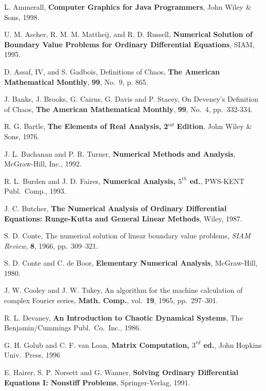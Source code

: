 \begin{thebibliography}{99}

 L. Ammerall, {\bfseries Computer Graphics for Java
Programmers}, John Wiley \& Sons, 1998.

 U. M. Ascher, R. M. M. Mattheij, and R. D. Russell,
{\bfseries Numerical Solution of Boundary Value Problems for Ordinary
Differential Equations}, SIAM, 1995.

 D. Assaf, IV, and S. Gadbois, Definitions of Chaos,
{\bfseries The American Mathematical Monthly}, {\bfseries 99}, No.\ 9, p. 865.

 J. Banks, J. Brooks, G. Cairns, G. Davis and
P. Stacey, On Deveney's Definition of Chaos, {\bfseries The American
Mathematical Monthly}, {\bfseries 99}, No.\ 4, pp.\ 332-334.

 R. G. Bartle, {\bfseries The Elements of Real Analysis, 2$^{nd}$
Edition}, John Wiley \& Sons, 1976.

 J. L. Buchanan and P. R. Turner, {\bfseries Numerical Methods
and Analysis}, McGraw-Hill, Inc., 1992.

 R. L. Burden and J. D. Faires, {\bfseries Numerical
Analysis, $5^{th}$ ed.}, PWS-KENT Publ.\ Comp., 1993.

 J. C. Butcher, {\bfseries The Numerical Analysis of
Ordinary Differential Equations: Runge-Kutta and General Linear
Methods}, Wiley, 1987.

 S. D. Conte, The numerical solution of linear boundary
value problems, {\em SIAM Review}, {\bfseries 8}, 1966, pp.\ 309--321.

 S. D. Conte and C. de Boor, {\bfseries Elementary
Numerical Analysis}, McGraw-Hill, 1980.

 J. W. Cooley and J. W. Tukey, An algorithm for the
machine calculation of complex Fourier series, {\bfseries Math. Comp.},
vol.\ {\bfseries 19}, 1965, pp.\ 297--301.

 R. L. Devaney, {\bfseries An Introduction to Chaotic
Dynamical Systems}, The Benjamin/Cummings Publ.\ Co.\ Inc., 1986.

 G. H. Golub and C. F. van Loan, {\bfseries Matrix
Computation, $3^{rd}$ ed.}, John Hopkins Univ.\ Press, 1996

 E. Hairer, S. P. Norsett and G. Wanner, {\bfseries
Solving Ordinary Differential Equations I: Nonstiff Problems},
Springer-Verlag, 1991.


\end{thebibliography}
